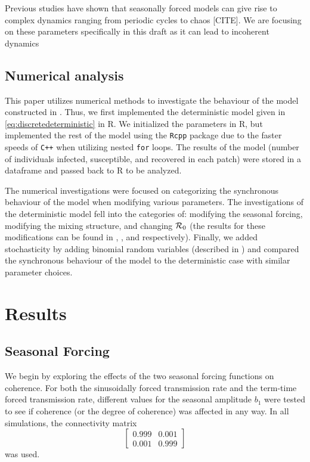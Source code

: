 \documentclass[12pt]{article}
\newcommand{\R}{{\cal R}}
\begin{document}
Previous studies have shown that seasonally forced models can give rise to complex dynamics ranging from periodic cycles to chaos [CITE]. We are focusing on these parameters specifically in this draft as it can lead to incoherent dynamics 

\subsection{Numerical analysis}
This paper utilizes numerical methods to investigate the behaviour of the model constructed in . Thus, we first implemented the deterministic model given in \autoref{eq:discretedeterministic} in R. We initialized the parameters in R, but implemented the rest of the model using the \texttt{Rcpp} package due to the faster speeds of \texttt{C++} when utilizing nested \texttt{for} loops. The results of the model (number of individuals infected, susceptible, and recovered in each patch) were stored in a dataframe and passed back to R to be analyzed.

The numerical investigations were focused on categorizing the synchronous behaviour of the model when modifying various parameters. The investigations of the deterministic model fell into the categories of: modifying the seasonal forcing, modifying the mixing structure, and changing $\R_0$ (the results for these modifications can be found in , , and  respectively). Finally, we added stochasticity by adding binomial random variables (described in ) and compared the synchronous behaviour of the model to the deterministic case with similar parameter choices.

\section{Results} \label{sec:numerical}
\subsection{Seasonal Forcing}
\label{ss:seasonalforcing}

We begin by exploring the effects of the two seasonal forcing functions on coherence. For both the sinusoidally forced transmission rate and the term-time forced transmission rate, different values for the seasonal amplitude $b_1$ were tested to see if coherence (or the degree of coherence) was affected in any way. In all simulations, the connectivity matrix
$$
\begin{bmatrix}
0.999 & 0.001\\
0.001 & 0.999
\end{bmatrix}
$$
was used.
\end{document}
